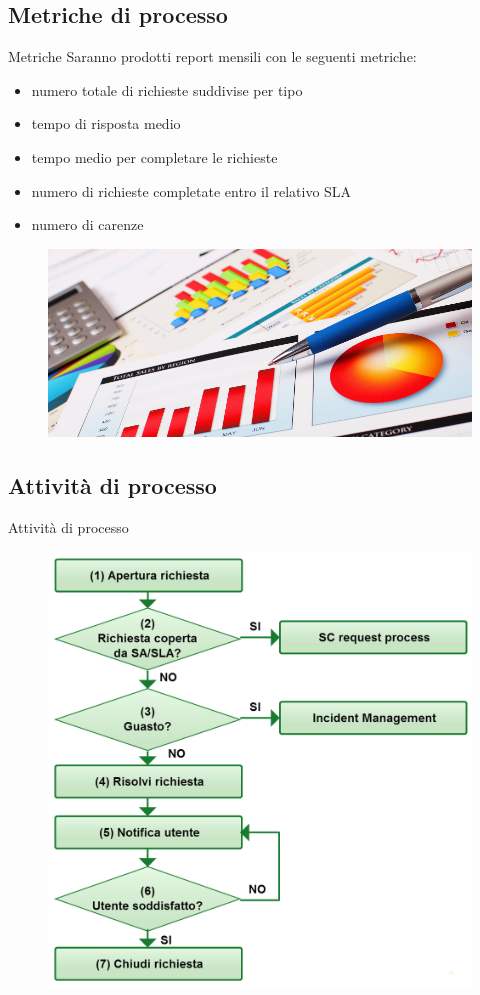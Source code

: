 \subsection*{Metriche di processo}
\begin{frame}{Metriche}
Saranno prodotti report mensili con le seguenti metriche:
\begin{itemize}
\item{numero totale di richieste suddivise per tipo}
\item{tempo di risposta medio}
\item{tempo medio per completare le richieste}
\item{numero di richieste completate entro il relativo SLA}
\item{numero di carenze}
\end{itemize}
\begin{figure}
\includegraphics[scale=0.13]{Images/Metrics.png}
\end{figure}
\end{frame}

\subsection*{Attività di processo}
\begin{frame}{Attività di processo}
\begin{figure}
\includegraphics[scale=0.22]{Images/Request_fulfillment.png}
\end{figure}
\end{frame}